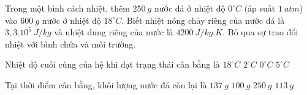 \begin{vidu} 
	Trong một bình cách nhiệt, thêm $250\ g$ nước đá ở nhiệt độ $0^\circ C$ (áp suất $1\ atm$) vào $600\ g$ nước ở nhiệt độ $18^\circ C$. Biết nhiệt nóng chảy riêng của nước đá là $3,3.10^5\ J/kg$ và nhiệt dung riêng của nước là $4200\ J/kg.K$. Bỏ qua sự trao đổi nhiệt với bình chứa và môi trường.
	\begin{vdc}
		Nhiệt độ cuối cùng của hệ khi đạt trạng thái cân bằng là
		\choice
		{$18^\circ C$}
		{$2^\circ C$}
		{\True $0^\circ C$}
		{$5^\circ C$}

	\end{vdc}
	\dotlineEX{4}
	\begin{vdc}
		Tại thời điểm cân bằng, khối lượng nước đá còn lại là
		\choice
		{$137\ g$}
		{$100\ g$}
		{$250\ g$}
		{\True $113\ g$}
		
	\end{vdc}
\end{vidu}











